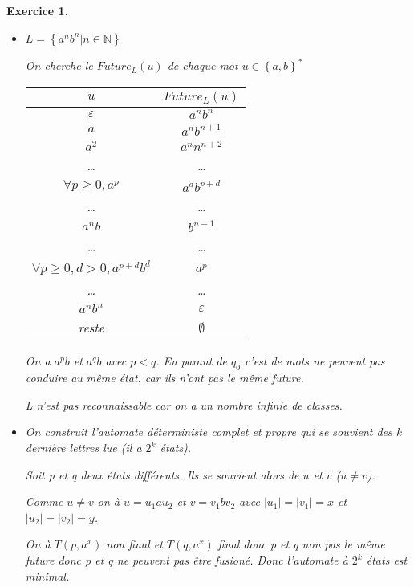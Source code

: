 \documentclass{article}
\theoremstyle{plain}
\newtheorem{exo}{Exercice}%
\begin{document}
\newpage
\begin{exo}
  \begin{itemize}
    \item[$\bullet$] $L = \left\{a^nb^n|n \in \mathbb{N}\right\}$

      On cherche le $Future_L(u)$ de chaque mot $u \in \left\{a, b\right\}^*$

      \begin{tabular}{cc}
        $u$                                     &   $Future_L(u)$ \\
        \hline
        $\varepsilon$                           &   $a^nb^n$ \\
        $a$                                     &   $a^nb^{n+1}$ \\
        $a^2$                                   &   $a^nn^{n+2}$ \\
        \ldots                                  &   \ldots \\
        $\forall p \geq 0, a^p$                 &   $a^db^{p+d}$ \\
        \ldots                                  &   \ldots \\
        $a^nb$                                  &   $b^{n-1}$ \\
        \ldots                                  &   \ldots \\
        $\forall p \geq 0, d > 0, a^{p+d}b^d$   &   $a^p$ \\
        \ldots                                  &   \ldots \\
        $a^nb^n$                                &   $\varepsilon$ \\
        reste                                   &   $\emptyset$
      \end{tabular}

      On a $a^pb$ et $a^qb$ avec $p < q$. En parant de $q_0$ c'est 
      de mots ne peuvent pas conduire au même état. car ils n'ont pas 
      le même future.

      L n'est pas reconnaissable car on a un nombre infinie de classes.

    \item[$\bullet$] On construit l'automate déterministe complet et propre 
      qui se souvient des k dernière lettres lue (il a $2^k$ états).

      Soit p et q deux états différents. Ils se souvient alors de $u$ et 
      $v$ ($u \neq v$). 
      
      Comme $u \neq v$ on à $u = u_1 a u_2$ et $v = v_1 b v_2$ avec 
      $|u_1| = |v_1| = x$ et $|u_2| = |v_2| = y$.

      On à $T(p, a^x)$ non final et $T(q, a^x)$ final donc p et q 
      non pas le même future donc p et q ne peuvent pas être fusioné. 
      Donc l'automate à $2^k$ états est minimal.
  \end{itemize}
\end{exo}
\end{document}
